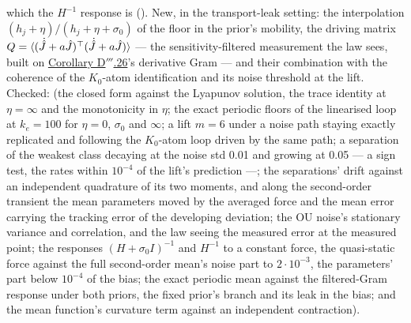 {which the $H^{-1}$ response is (\cite{S57}). New, in the transport-leak setting: the interpolation
$(h_j + \eta)/(h_j + \eta + \sigma_0)$ of the floor in the prior's mobility, the driving matrix
$Q = \langle(\dot{\hat J} + a\hat J)^\top(\dot{\hat J} + a\hat J)\rangle$ --- the sensitivity-filtered measurement the
law sees, built on \hyperref[res:thmDppp:26]{Corollary D$'''$.26}'s derivative Gram --- and their combination with the
coherence of the $K_0$-atom identification and its noise threshold at the lift. Checked:
 (the closed form against the Lyapunov solution, the trace identity at
$\eta = \infty$ and the monotonicity in $\eta$; the exact periodic floors of the linearised loop at $k_e = 100$ for
$\eta = 0$, $\sigma_0$ and $\infty$; a lift $m = 6$ under a noise path staying exactly replicated and following the
$K_0$-atom loop driven by the same path; a separation of the weakest class decaying at the noise std 0.01 and growing
at 0.05 --- a sign test, the rates within $10^{-4}$ of the lift's prediction ---; the separations' drift against an
independent quadrature of its two moments, and along the second-order transient the mean parameters moved by the
averaged force and the mean error carrying the tracking error of the developing deviation; the OU noise's stationary
variance and correlation, and the law seeing the measured error at the measured point; the responses
$(H + \sigma_0I)^{-1}$ and $H^{-1}$ to a constant force, the quasi-static force against the full second-order mean's
noise part to $2\cdot10^{-3}$, the parameters' part below $10^{-4}$ of the bias; the exact periodic mean against the
filtered-Gram response under both priors, the fixed prior's branch and its leak in the bias; and the mean function's
curvature term against an independent contraction).}

